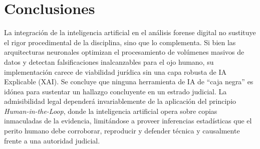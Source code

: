\documentclass[journal]{IEEEtran}
\begin{document}
\section{Conclusiones}
La integración de la inteligencia artificial en el análisis forense digital no sustituye el rigor procedimental de la disciplina, sino que lo complementa. Si bien las arquitecturas neuronales optimizan el procesamiento de volúmenes masivos de datos y detectan falsificaciones inalcanzables para el ojo humano, su implementación carece de viabilidad jurídica sin una capa robusta de IA Explicable (XAI). Se concluye que ninguna herramienta de IA de ``caja negra'' es idónea para sustentar un hallazgo concluyente en un estrado judicial. La admisibilidad legal dependerá invariablemente de la aplicación del principio \textit{Human-in-the-Loop}, donde la inteligencia artificial opera sobre copias inmaculadas de la evidencia, limitándose a proveer inferencias estadísticas que el perito humano debe corroborar, reproducir y defender técnica y causalmente frente a una autoridad judicial.

\nocite{*}
\printbibliography
\end{document}
